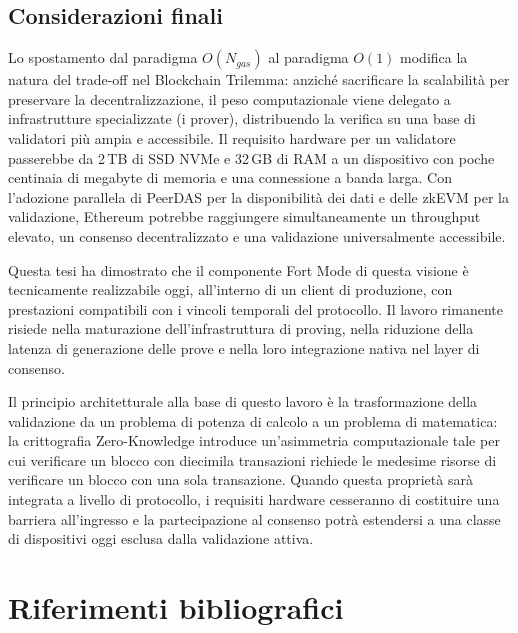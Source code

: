\documentclass[12pt,a4paper,openright,twoside]{report}
\begin{document}
\section{Considerazioni finali}

Lo spostamento dal paradigma $O(N_{gas})$ al paradigma $O(1)$ modifica la natura del trade-off nel Blockchain Trilemma: anziché sacrificare la scalabilità per preservare la decentralizzazione, il peso computazionale viene delegato a infrastrutture specializzate (i prover), distribuendo la verifica su una base di validatori più ampia e accessibile. Il requisito hardware per un validatore passerebbe da 2\,TB di SSD NVMe e 32\,GB di RAM a un dispositivo con poche centinaia di megabyte di memoria e una connessione a banda larga. Con l'adozione parallela di PeerDAS per la disponibilità dei dati e delle zkEVM per la validazione, Ethereum potrebbe raggiungere simultaneamente un throughput elevato, un consenso decentralizzato e una validazione universalmente accessibile.

Questa tesi ha dimostrato che il componente Fort Mode di questa visione è tecnicamente realizzabile oggi, all'interno di un client di produzione, con prestazioni compatibili con i vincoli temporali del protocollo. Il lavoro rimanente risiede nella maturazione dell'infrastruttura di proving, nella riduzione della latenza di generazione delle prove e nella loro integrazione nativa nel layer di consenso.

Il principio architetturale alla base di questo lavoro è la trasformazione della validazione da un problema di potenza di calcolo a un problema di matematica: la crittografia Zero-Knowledge introduce un'asimmetria computazionale tale per cui verificare un blocco con diecimila transazioni richiede le medesime risorse di verificare un blocco con una sola transazione. Quando questa proprietà sarà integrata a livello di protocollo, i requisiti hardware cesseranno di costituire una barriera all'ingresso e la partecipazione al consenso potrà estendersi a una classe di dispositivi oggi esclusa dalla validazione attiva.

\renewcommand{\bibsection}{}
\chapter*{Riferimenti bibliografici}

\end{document}
